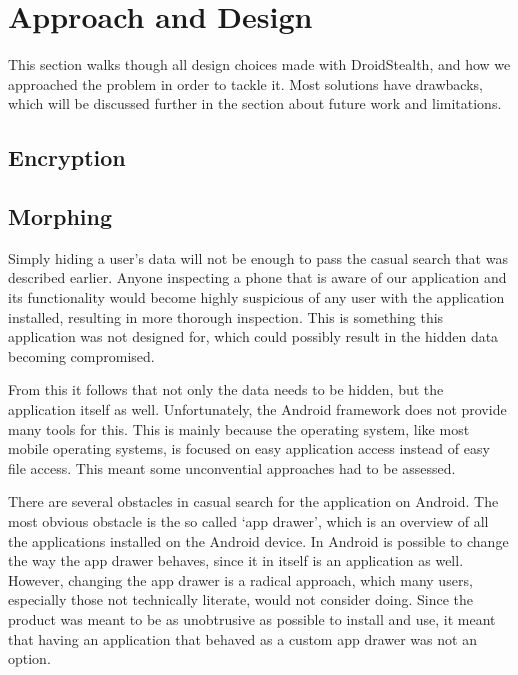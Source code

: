 \section{Approach and Design}
\label{sec:approach-and-design}
This section walks though all design choices made with DroidStealth,
and how we approached the problem in order to tackle it. Most 
solutions have drawbacks, which will be discussed further in the
section about future work and limitations. %


\subsection{Encryption}
\label{sec:approach-and-design:encryption}

\subsection{Morphing}
\label{sec:approach-and-design:morphing}

Simply hiding a user's data will not be enough to pass the casual search that was described earlier. 
Anyone inspecting a phone that is aware of our application and its functionality would become highly suspicious of any user with the application installed, resulting in more thorough inspection. 
This is something this application was not designed for, which could possibly result in the hidden data becoming compromised. 

From this it follows that not only the data needs to be hidden, but the application itself as well. 
Unfortunately, the Android framework does not provide many tools for this. 
This is mainly because the operating system, like most mobile operating systems, is focused on easy application access instead of easy file access. 
This meant some unconvential approaches had to be assessed.

There are several obstacles in casual search for the application on Android. 
The most obvious obstacle is the so called `app drawer', which is an overview of all the applications installed on the Android device.
In Android is possible to change the way the app drawer behaves, since it in itself is an application as well.
However, changing the app drawer is a radical approach, which many users, especially those not technically literate, would not consider doing.
Since the product was meant to be as unobtrusive as possible to install and use, it meant that having an application that behaved as a custom app drawer was not an option.

